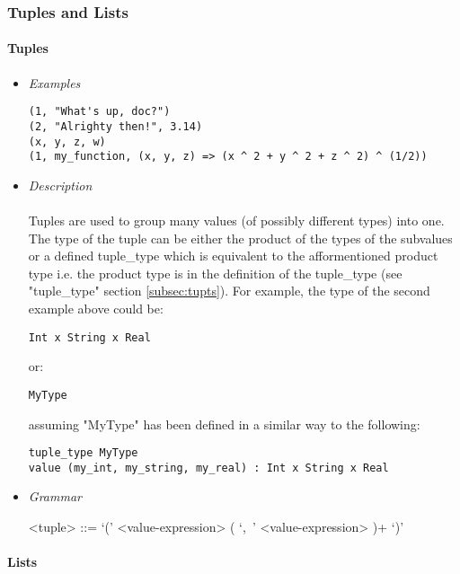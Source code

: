 \documentclass{article}
\begin{document}
\newpage
\subsubsection{Tuples and Lists}

\paragraph{Tuples}

\begin{itemize}

\item \textit{Examples}
\begin{verbatim}
(1, "What's up, doc?")
(2, "Alrighty then!", 3.14)
(x, y, z, w)
(1, my_function, (x, y, z) => (x ^ 2 + y ^ 2 + z ^ 2) ^ (1/2))
\end{verbatim}

\item \textit{Description} \\\\
Tuples are used to group many values (of possibly different types) into one.
The type of the tuple can be either the product of the types of the subvalues or a
defined tuple\_type which is equivalent to the afformentioned product type i.e.
the product type is in the definition of the tuple\_type (see "tuple\_type"
section \ref{subsec:tupts}). For example, the type of the second example above 
could be:
\begin{verbatim}
Int x String x Real
\end{verbatim}
or:
\begin{verbatim}
MyType
\end{verbatim}
assuming "MyType" has been defined in a similar way to the following:
\begin{verbatim}
tuple_type MyType
value (my_int, my_string, my_real) : Int x String x Real
\end{verbatim}

\item \textit{Grammar}
\begin{grammar}
<tuple> ::= `(' <value-expression> ( `,\ ' <value-expression> )+ `)'
\end{grammar}

\end{itemize}

\paragraph{Lists}
\end{document}
